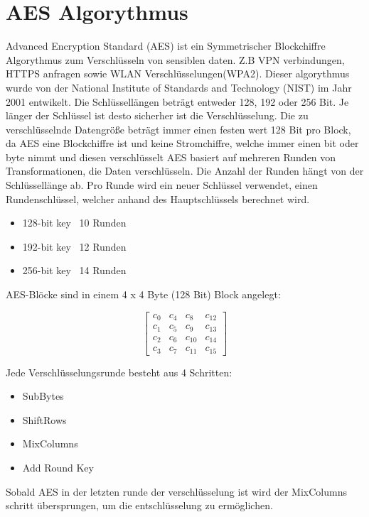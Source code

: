 \section{AES Algorythmus}
\setlength{\parindent}{0pt}


Advanced Encryption Standard (AES) ist ein Symmetrischer Blockchiffre Algorythmus zum 
Verschlüsseln von sensiblen daten. Z.B VPN verbindungen, HTTPS anfragen sowie WLAN Verschlüsselungen(WPA2).
Dieser algorythmus wurde von der National Institute of Standards and Technology (NIST) im Jahr 2001 entwikelt. 
Die Schlüssellängen beträgt entweder 128, 192 oder 256 Bit. Je länger der Schlüssel ist desto sicherher ist die Verschlüsselung.
Die zu verschlüsselnde Datengröße beträgt immer einen festen wert 128 Bit pro Block, da AES eine Blockchiffre ist und keine Stromchiffre,
 welche immer einen bit oder byte nimmt und diesen verschlüsselt 
AES basiert auf mehreren Runden von Transformationen, die Daten verschlüsseln. Die Anzahl der Runden hängt von der Schlüssellänge ab.
Pro Runde wird ein neuer Schlüssel verwendet, einen Rundenschlüssel, welcher anhand des Hauptschlüssels berechnet wird.
\begin{itemize}
    \item 128-bit key \textendash\ 10 Runden
    \item 192-bit key \textendash\ 12 Runden
    \item 256-bit key \textendash\ 14 Runden\\
\end{itemize}



AES-Blöcke sind in einem 4 x 4 Byte (128 Bit) Block angelegt:

\[
\begin{bmatrix}
c_0  & c_4  & c_8  & c_{12} \\
c_1  & c_5  & c_9  & c_{13} \\
c_2  & c_6  & c_{10} & c_{14} \\
c_3  & c_7  & c_{11} & c_{15}
\end{bmatrix}
\]

Jede Verschlüsselungsrunde besteht aus 4 Schritten:
\begin{itemize}
    \item SubBytes
    \item ShiftRows
    \item MixColumns
    \item Add Round Key
\end{itemize}

Sobald AES in der letzten runde der verschlüsselung ist wird der MixColumns schritt übersprungen, um die entschlüsselung zu ermöglichen.\\

